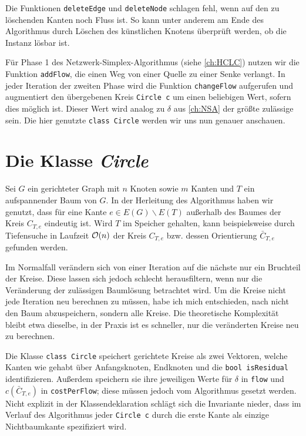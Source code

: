 Die Funktionen \lstinline|deleteEdge| und \lstinline|deleteNode| schlagen fehl, wenn auf den zu löschenden Kanten noch Fluss ist. So kann unter anderem am Ende des Algorithmus durch Löschen des künstlichen Knotens überprüft werden, ob die Instanz lösbar ist.

Für Phase 1 des Netzwerk-Simplex-Algorithmus (siehe \cref{ch:HCLC}) nutzen wir die Funktion \lstinline|addFlow|, die einen Weg von einer Quelle zu einer Senke verlangt. In jeder Iteration der zweiten Phase wird die Funktion \lstinline|changeFlow| aufgerufen und augmentiert den übergebenen Kreis \lstinline|Circle c| um einen beliebigen Wert, sofern dies möglich ist. Dieser Wert wird analog zu $\delta$ aus \cref{ch:NSA} der größte zulässige sein. Die hier genutzte \lstinline|class Circle| werden wir uns nun genauer anschauen.

\section{Die Klasse \emph{Circle}}\label{ch:circle}
Sei $G$ ein gerichteter Graph mit $n$ Knoten sowie $m$ Kanten und $T$ ein aufspannender Baum von $G$. In der Herleitung des Algorithmus haben wir genutzt, dass für eine Kante $e\in E(G)\backslash E(T)$ außerhalb des Baumes der Kreis $C_{T,e}$ eindeutig ist. Wird $T$ im Speicher gehalten, kann beispielsweise durch Tiefensuche in Laufzeit $\mathcal{O}(n)$ der Kreis $C_{T,e}$ bzw. dessen Orientierung $\bar{C}_{T,e}$ gefunden werden.

Im Normalfall verändern sich von einer Iteration auf die nächste nur ein Bruchteil der Kreise. Diese lassen sich jedoch schlecht herausfiltern, wenn nur die Veränderung der zulässigen Baumlösung betrachtet wird. Um die Kreise nicht jede Iteration neu berechnen zu müssen, habe ich mich entschieden, nach \cite{betreuer} nicht den Baum abzuspeichern, sondern alle Kreise. Die theoretische Komplexität bleibt etwa dieselbe,\footnotemark{} in der Praxis ist es schneller, nur die veränderten Kreise neu zu berechnen.


Die Klasse \lstinline|class Circle| speichert gerichtete Kreise als zwei Vektoren, welche Kanten wie gehabt über Anfangsknoten, Endknoten und die \lstinline|bool isResidual| identifizieren. Außerdem speichern sie ihre jeweiligen Werte für $\delta$ in \lstinline|flow| und $c(\bar{C}_{T,e})$ in \lstinline|costPerFlow|; diese müssen jedoch vom Algorithmus gesetzt werden. Nicht explizit in der Klassendeklaration schlägt sich die Invariante nieder, dass im Verlauf des Algorithmus jeder \lstinline|Circle c| durch die erste Kante als einzige Nichtbaumkante spezifiziert wird.

